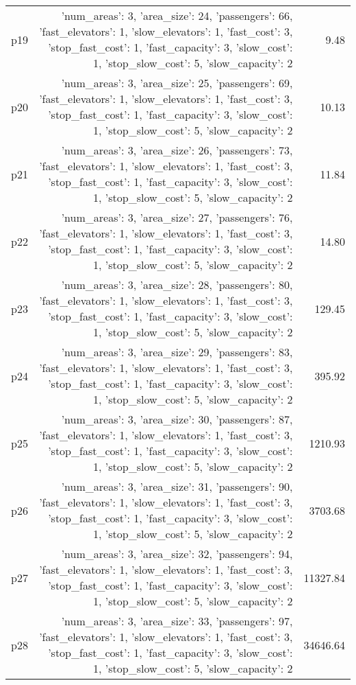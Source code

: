 \documentclass{article}
\begin{document}
\begin{center}
\begin{tabular}{@{}l|r|r@{}}
  p19&{'num\_areas': 3, 'area\_size': 24, 'passengers': 66, 'fast\_elevators': 1, 'slow\_elevators': 1, 'fast\_cost': 3, 'stop\_fast\_cost': 1, 'fast\_capacity': 3, 'slow\_cost': 1, 'stop\_slow\_cost': 5, 'slow\_capacity': 2}&9.48\\
  p20&{'num\_areas': 3, 'area\_size': 25, 'passengers': 69, 'fast\_elevators': 1, 'slow\_elevators': 1, 'fast\_cost': 3, 'stop\_fast\_cost': 1, 'fast\_capacity': 3, 'slow\_cost': 1, 'stop\_slow\_cost': 5, 'slow\_capacity': 2}&10.13\\
  p21&{'num\_areas': 3, 'area\_size': 26, 'passengers': 73, 'fast\_elevators': 1, 'slow\_elevators': 1, 'fast\_cost': 3, 'stop\_fast\_cost': 1, 'fast\_capacity': 3, 'slow\_cost': 1, 'stop\_slow\_cost': 5, 'slow\_capacity': 2}&11.84\\
  p22&{'num\_areas': 3, 'area\_size': 27, 'passengers': 76, 'fast\_elevators': 1, 'slow\_elevators': 1, 'fast\_cost': 3, 'stop\_fast\_cost': 1, 'fast\_capacity': 3, 'slow\_cost': 1, 'stop\_slow\_cost': 5, 'slow\_capacity': 2}&14.80\\
  p23&{'num\_areas': 3, 'area\_size': 28, 'passengers': 80, 'fast\_elevators': 1, 'slow\_elevators': 1, 'fast\_cost': 3, 'stop\_fast\_cost': 1, 'fast\_capacity': 3, 'slow\_cost': 1, 'stop\_slow\_cost': 5, 'slow\_capacity': 2}&129.45\\
  p24&{'num\_areas': 3, 'area\_size': 29, 'passengers': 83, 'fast\_elevators': 1, 'slow\_elevators': 1, 'fast\_cost': 3, 'stop\_fast\_cost': 1, 'fast\_capacity': 3, 'slow\_cost': 1, 'stop\_slow\_cost': 5, 'slow\_capacity': 2}&395.92\\
  p25&{'num\_areas': 3, 'area\_size': 30, 'passengers': 87, 'fast\_elevators': 1, 'slow\_elevators': 1, 'fast\_cost': 3, 'stop\_fast\_cost': 1, 'fast\_capacity': 3, 'slow\_cost': 1, 'stop\_slow\_cost': 5, 'slow\_capacity': 2}&1210.93\\
  p26&{'num\_areas': 3, 'area\_size': 31, 'passengers': 90, 'fast\_elevators': 1, 'slow\_elevators': 1, 'fast\_cost': 3, 'stop\_fast\_cost': 1, 'fast\_capacity': 3, 'slow\_cost': 1, 'stop\_slow\_cost': 5, 'slow\_capacity': 2}&3703.68\\
  p27&{'num\_areas': 3, 'area\_size': 32, 'passengers': 94, 'fast\_elevators': 1, 'slow\_elevators': 1, 'fast\_cost': 3, 'stop\_fast\_cost': 1, 'fast\_capacity': 3, 'slow\_cost': 1, 'stop\_slow\_cost': 5, 'slow\_capacity': 2}&11327.84\\
  p28&{'num\_areas': 3, 'area\_size': 33, 'passengers': 97, 'fast\_elevators': 1, 'slow\_elevators': 1, 'fast\_cost': 3, 'stop\_fast\_cost': 1, 'fast\_capacity': 3, 'slow\_cost': 1, 'stop\_slow\_cost': 5, 'slow\_capacity': 2}&34646.64\\

\end{tabular}
\end{center}
\end{document}
